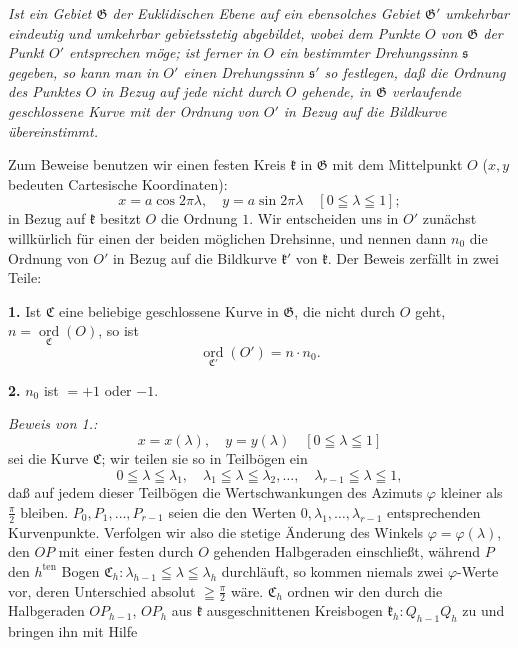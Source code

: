 \documentclass{article}
\begin{document}
\emph{Ist ein Gebiet $\mathfrak{G}$ der Euklidischen Ebene auf ein ebensolches Gebiet $\mathfrak{G}'$ umkehrbar eindeutig und umkehrbar gebietsstetig abgebildet, wobei dem Punkte $O$ von $\mathfrak{G}$ der Punkt $O'$ entsprechen möge; ist ferner in $O$ ein bestimmter Drehungssinn $\mathfrak{s}$ gegeben, so kann man in $O'$ einen Drehungssinn $\mathfrak{s}'$ so festlegen, daß die Ordnung des Punktes $O$ in Bezug auf jede nicht durch $O$ gehende, in $\mathfrak{G}$ verlaufende geschlossene Kurve mit der Ordnung von $O'$ in Bezug auf die Bildkurve übereinstimmt.}

Zum Beweise benutzen wir einen festen Kreis $\mathfrak{k}$ in $\mathfrak{G}$ mit dem Mittelpunkt $O$ ($x, y$ bedeuten Cartesische Koordinaten):
\[ x = a \cos 2\pi\lambda, \quad y = a \sin 2\pi\lambda \quad [0 \leqq \lambda \leqq 1]; \]
in Bezug auf $\mathfrak{k}$ besitzt $O$ die Ordnung $1$. Wir entscheiden uns in $O'$ zunächst willkürlich für einen der beiden möglichen Drehsinne, und nennen dann $n_0$ die Ordnung von $O'$ in Bezug auf die Bildkurve $\mathfrak{k}'$ von $\mathfrak{k}$. Der Beweis zerfällt in zwei Teile:

\textbf{1.} Ist $\mathfrak{C}$ eine beliebige geschlossene Kurve in $\mathfrak{G}$, die nicht durch $O$ geht, $n = \underset{\mathfrak{C}}{\operatorname{ord}}(O)$, so ist
\[ \underset{\mathfrak{C}'}{\operatorname{ord}}(O') = n \cdot n_0. \]

\textbf{2.} $n_0$ ist $= +1$ oder $-1$.

\emph{Beweis von 1.:}
\[ x = x(\lambda), \quad y = y(\lambda) \quad [0 \leqq \lambda \leqq 1] \]
sei die Kurve $\mathfrak{C}$; wir teilen sie so in Teilbögen ein
\[ 0 \leqq \lambda \leqq \lambda_1, \quad \lambda_1 \leqq \lambda \leqq \lambda_2, \dots, \quad \lambda_{r-1} \leqq \lambda \leqq 1, \]
daß auf jedem dieser Teilbögen die Wertschwankungen des Azimuts $\varphi$ kleiner als $\frac{\pi}{2}$ bleiben. $P_0, P_1, \dots, P_{r-1}$ seien die den Werten $0, \lambda_1, \dots, \lambda_{r-1}$ entsprechenden Kurvenpunkte. Verfolgen wir also die stetige Änderung des Winkels $\varphi = \varphi(\lambda)$, den $OP$ mit einer festen durch $O$ gehenden Halbgeraden einschließt, während $P$ den $h^{\text{ten}}$ Bogen $\mathfrak{C}_h\colon \lambda_{h-1} \leqq \lambda \leqq \lambda_h$ durchläuft, so kommen niemals zwei $\varphi$-Werte vor, deren Unterschied absolut $\geqq \frac{\pi}{2}$ wäre. $\mathfrak{C}_h$ ordnen wir den durch die Halbgeraden $OP_{h-1}$, $OP_h$ aus $\mathfrak{k}$ ausgeschnittenen Kreisbogen $\mathfrak{k}_h\colon Q_{h-1} Q_h$ zu und bringen ihn mit Hilfe
\end{document}
